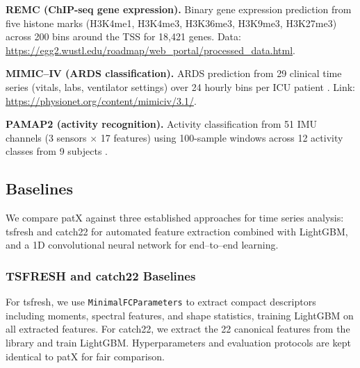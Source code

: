\documentclass[11pt]{article}
\begin{document}
\textbf{REMC (ChIP-seq gene expression).}
Binary gene expression prediction from five histone marks (H3K4me1, H3K4me3,
H3K36me3, H3K9me3, H3K27me3) across 200 bins around the TSS for 18,421 genes.
Data: \url{https://egg2.wustl.edu/roadmap/web_portal/processed_data.html}.

\textbf{MIMIC--IV (ARDS classification).}
ARDS prediction from 29 clinical time series (vitals, labs, ventilator settings)
over 24 hourly bins per ICU patient \cite{Johnson2023MIMICIV}.
Link: \url{https://physionet.org/content/mimiciv/3.1/}.

\textbf{PAMAP2 (activity recognition).}
Activity classification from 51 IMU channels (3 sensors $\times$ 17 features)
using 100-sample windows across 12 activity classes from 9 subjects
\cite{Reiss2012PAMAP2}.

\subsection{Baselines}
We compare patX against three established approaches for time series analysis:
tsfresh and catch22 for automated feature extraction combined with LightGBM,
and a 1D convolutional neural network for end--to--end learning.

\subsubsection{TSFRESH and catch22 Baselines}
For tsfresh, we use \texttt{MinimalFCParameters} to extract compact descriptors
including moments, spectral features, and shape statistics, training LightGBM
on all extracted features.
For catch22, we extract the 22 canonical features from the library
\cite{lubba2019catch22} and train LightGBM.
Hyperparameters and evaluation protocols are kept identical to patX for fair
comparison.
\end{document}
